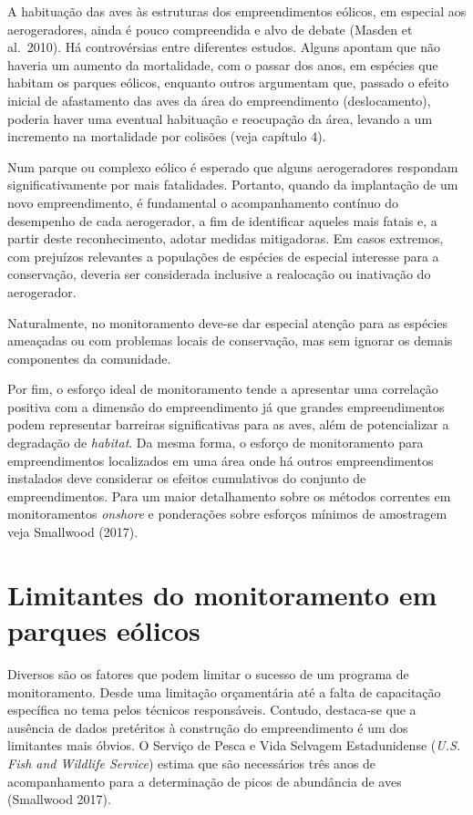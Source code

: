 \documentclass[
  oneside]{scrbook}
\begin{document}
A habituação das aves às estruturas dos empreendimentos eólicos, em especial aos aerogeradores, ainda é pouco compreendida e alvo de debate (Masden et al.~2010). Há controvérsias entre diferentes estudos. Alguns apontam que não haveria um aumento da mortalidade, com o passar dos anos, em espécies que habitam os parques eólicos, enquanto outros argumentam que, passado o efeito inicial de afastamento das aves da área do empreendimento (deslocamento), poderia haver uma eventual habituação e reocupação da área, levando a um incremento na mortalidade por colisões (veja capítulo 4).

Num parque ou complexo eólico é esperado que alguns aerogeradores respondam significativamente por mais fatalidades. Portanto, quando da implantação de um novo empreendimento, é fundamental o acompanhamento contínuo do desempenho de cada aerogerador, a fim de identificar aqueles mais fatais e, a partir deste reconhecimento, adotar medidas mitigadoras. Em casos extremos, com prejuízos relevantes a populações de espécies de especial interesse para a conservação, deveria ser considerada inclusive a realocação ou inativação do aerogerador.

Naturalmente, no monitoramento deve-se dar especial atenção para as espécies ameaçadas ou com problemas locais de conservação, mas sem ignorar os demais componentes da comunidade.

Por fim, o esforço ideal de monitoramento tende a apresentar uma correlação positiva com a dimensão do empreendimento já que grandes empreendimentos podem representar barreiras significativas para as aves, além de potencializar a degradação de \emph{habitat}. Da mesma forma, o esforço de monitoramento para empreendimentos localizados em uma área onde há outros empreendimentos instalados deve considerar os efeitos cumulativos do conjunto de empreendimentos. Para um maior detalhamento sobre os métodos correntes em monitoramentos \emph{onshore} e ponderações sobre esforços mínimos de amostragem veja Smallwood (2017).

\hypertarget{limitantes-do-monitoramento-em-parques-euxf3licos}{%
\section{Limitantes do monitoramento em parques eólicos}\label{limitantes-do-monitoramento-em-parques-euxf3licos}}

Diversos são os fatores que podem limitar o sucesso de um programa de monitoramento. Desde uma limitação orçamentária até a falta de capacitação específica no tema pelos técnicos responsáveis. Contudo, destaca-se que a ausência de dados pretéritos à construção do empreendimento é um dos limitantes mais óbvios. O Serviço de Pesca e Vida Selvagem Estadunidense (\emph{U.S. Fish and Wildlife Service}) estima que são necessários três anos de acompanhamento para a determinação de picos de abundância de aves (Smallwood 2017).
\end{document}
